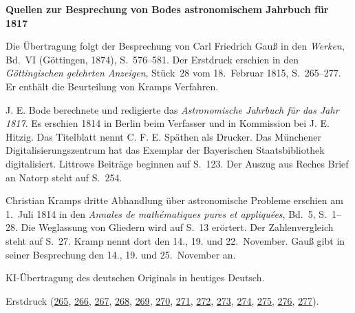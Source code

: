 \clearpage\thispagestyle{empty}
\begin{center}\Large\bfseries Quellen zur Besprechung von Bodes astronomischem Jahrbuch für 1817\end{center}

Die Übertragung folgt der Besprechung von Carl Friedrich Gauß in den \emph{Werken}, Bd.~VI (Göttingen, 1874), S.~576--581. Der Erstdruck erschien in den \emph{Göttingischen gelehrten Anzeigen}, Stück~28 vom 18.~Februar 1815, S.~265--277. Er enthält die Beurteilung von Kramps Verfahren.

J. E. Bode berechnete und redigierte das \emph{Astronomische Jahrbuch für das Jahr 1817}. Es erschien 1814 in Berlin beim Verfasser und in Kommission bei J. E. Hitzig. Das Titelblatt nennt C. F. E. Späthen als Drucker. Das Münchener Digitalisierungszentrum hat das Exemplar der Bayerischen Staatsbibliothek digitalisiert. Littrows Beiträge beginnen auf S.~123. Der Auszug aus Reches Brief an Natorp steht auf S.~254.

Christian Kramps dritte Abhandlung über astronomische Probleme erschien am 1.~Juli 1814 in den \emph{Annales de mathématiques pures et appliquées}, Bd.~5, S.~1--28. Die Weglassung von Gliedern wird auf S.~13 erörtert. Der Zahlenvergleich steht auf S.~27. Kramp nennt dort den 14., 19. und 22.~November. Gauß gibt in seiner Besprechung den 14., 19. und 25.~November an.

KI-Übertragung des deutschen Originals in heutiges Deutsch.

Erstdruck (\href{https://images.p.sub.uni-goettingen.de/iiif/image/gdz:PPN319721507_1815:00000269/full/1650,/0/default.jpg}{265}, \href{https://images.p.sub.uni-goettingen.de/iiif/image/gdz:PPN319721507_1815:00000270/full/1650,/0/default.jpg}{266}, \href{https://images.p.sub.uni-goettingen.de/iiif/image/gdz:PPN319721507_1815:00000271/full/1650,/0/default.jpg}{267}, \href{https://images.p.sub.uni-goettingen.de/iiif/image/gdz:PPN319721507_1815:00000272/full/1650,/0/default.jpg}{268}, \href{https://images.p.sub.uni-goettingen.de/iiif/image/gdz:PPN319721507_1815:00000273/full/1650,/0/default.jpg}{269}, \href{https://images.p.sub.uni-goettingen.de/iiif/image/gdz:PPN319721507_1815:00000274/full/1650,/0/default.jpg}{270}, \href{https://images.p.sub.uni-goettingen.de/iiif/image/gdz:PPN319721507_1815:00000275/full/1650,/0/default.jpg}{271}, \href{https://images.p.sub.uni-goettingen.de/iiif/image/gdz:PPN319721507_1815:00000276/full/1650,/0/default.jpg}{272}, \href{https://images.p.sub.uni-goettingen.de/iiif/image/gdz:PPN319721507_1815:00000277/full/1650,/0/default.jpg}{273}, \href{https://images.p.sub.uni-goettingen.de/iiif/image/gdz:PPN319721507_1815:00000278/full/1650,/0/default.jpg}{274}, \href{https://images.p.sub.uni-goettingen.de/iiif/image/gdz:PPN319721507_1815:00000279/full/1650,/0/default.jpg}{275}, \href{https://images.p.sub.uni-goettingen.de/iiif/image/gdz:PPN319721507_1815:00000280/full/1650,/0/default.jpg}{276}, \href{https://images.p.sub.uni-goettingen.de/iiif/image/gdz:PPN319721507_1815:00000281/full/1650,/0/default.jpg}{277}).

